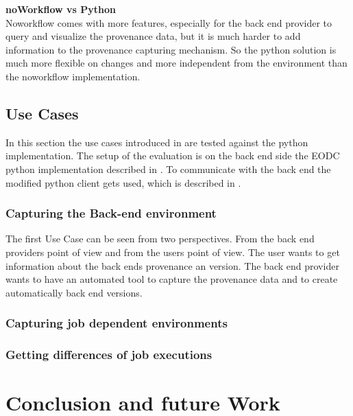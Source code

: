 \documentclass[draft,final]{vutinfth} %
\begin{document}
\textbf{noWorkflow vs Python} \\
Noworkflow comes with more features, especially for the back end provider to query and visualize the provenance data, but it is much harder to add information to the provenance capturing mechanism. So the python solution is much more flexible on changes and more independent from the environment than the noworkflow implementation.  

\section{Use Cases}\label{Evaluation:Use Cases}
In this section the use cases introduced in  are tested against the python implementation. The setup of the evaluation is on the back end side the EODC python implementation described in . To communicate with the back end the modified python client gets used, which is described in . 

\subsection{Capturing the Back-end environment}\label{Evaluation:Use Case1}
The first Use Case can be seen from two perspectives. From the back end providers point of view and from the users point of view. The user wants to get information about the back ends provenance an version. The back end provider wants to have an automated tool to capture the provenance data and to create automatically back end versions. 


\subsection{Capturing job dependent environments}\label{Evaluation:Use Case2}

\subsection{Getting differences of job executions}\label{Evaluation:Use Case3}

\chapter{Conclusion and future Work}\label{Conclusion}
\end{document}
